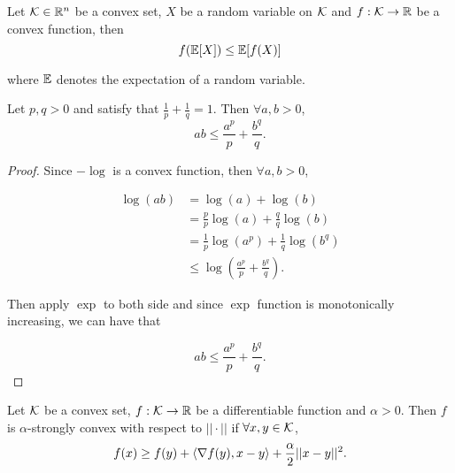 \documentclass[../main.tex]{subfiles}
\begin{document}
\begin{theorem}
	Let $\mathcal{K} \in \mathbb{R}^n$ be a convex set, $X$ be a random variable on $\mathcal{K}$ and $f:\mathcal{K} \to \mathbb{R}$ be a convex function, then
	\begin{equation}
		f(\mathbb{E}[X]) \leq \mathbb{E}[f(X)]
	\end{equation}
	
	where $\mathbb{E}$ denotes the expectation of a random variable.
\end{theorem}

\begin{theorem}
	Let $p, q > 0$ and satisfy that $\frac{1}{p} + \frac{1}{q} = 1$. Then $\forall a, b > 0$,
	\begin{equation}
		ab \leq \frac{a^p}{p} + \frac{b^q}{q}.
	\end{equation}
\end{theorem}

\begin{proof}
	Since $-\log$ is a convex function, then $\forall a, b > 0$,
	
	\begin{equation*}
		\begin{aligned}
			\log(ab) & =\log(a) + \log(b) \\
					 & = \frac{p}{p} \log (a) + \frac{q}{q}\log (b)\\
					 & = \frac{1}{p} \log(a^p) + \frac{1}{q} \log(b^q) \\
					 & \leq \log (\frac{a^p}{p} + \frac{b^q}{q} ).
		\end{aligned}
	\end{equation*}
	
	Then apply $\exp$ to both side and since $\exp$ function is monotonically increasing, we can have that 
	
	\begin{equation*}
	ab \leq \frac{a^p}{p} + \frac{b^q}{q}.
	\end{equation*}
\end{proof}


\begin{definition}
	Let $\mathcal{K}$ be a convex set, $f: \mathcal{K} \to \mathbb{R}$ be a differentiable function and $\alpha > 0$. Then $f$ is $\alpha$-strongly convex with respect to $||\cdot||$ if $\forall x, y \in \mathcal{K}$, 
	\begin{equation}
		f(x) \geq f(y) + \langle \nabla f(y), x - y \rangle + \frac{\alpha}{2} ||x - y||^2.
	\end{equation}
\end{definition}
\end{document}
